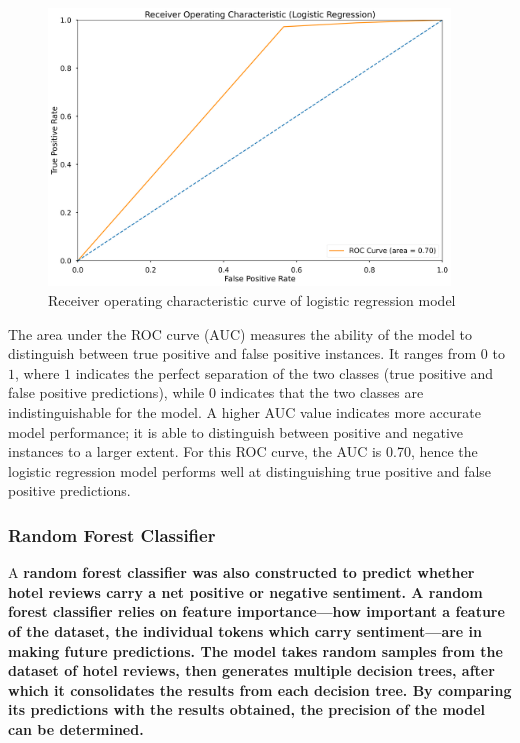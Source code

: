 \documentclass[12pt,bibliography=totocnumbered]{scrartcl}
\begin{document}
\begin{figure}[htpb]
	\begin{center}
		\includegraphics[width=0.95\textwidth]{../results/rq3/roc_logreg.png}
	\end{center}
	\caption{Receiver operating characteristic curve of logistic regression model}
	\label{fig:lg-roc}
\end{figure}

The area under the ROC curve (AUC) measures the ability of the model to
distinguish between true positive and false positive instances. It ranges
from $0$ to $1$, where $1$ indicates the perfect separation of the two classes
(true positive and false positive predictions), while $0$ indicates that the two classes
are indistinguishable for the model. A higher AUC value indicates more accurate model
performance; it is able to distinguish between positive and negative instances to a
larger extent. For this ROC curve, the AUC is $0$.70, hence the logistic regression model
performs well at distinguishing true positive and false positive predictions.

\subsubsection{Random Forest Classifier}
A \bf{random forest classifier} was also constructed to predict
whether hotel reviews carry a net positive or negative sentiment.
A random forest classifier relies on feature importance---how important a feature of
the dataset, the individual tokens which carry sentiment---are in making future predictions.
The model takes random samples from the dataset of hotel reviews, then generates
multiple decision trees, after which it consolidates the results from each decision tree.
By comparing its predictions with the results obtained, the precision of the model can be
determined.
\end{document}
